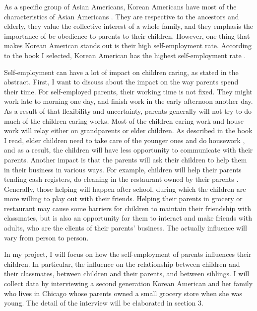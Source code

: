 As a specific group of Asian Americans, Korean Americans have most of the
characteristics of Asian Americans \cite{online:AsianAmericanChar}. They are
respective to the ancestors and elderly, they value the collective interest of a
whole family, and they emphasis the importance of be obedience to parents to
their children. However, one thing that makes Korean American stands out is
their high self-employment rate. According to the book I selected, Korean
American has the highest self-employment
rate \cite[p.~14]{book:ISelected}. 
\par
Self-employment can have a lot of impact on children caring, as stated in the
abstract. First, I want to discuss about the impact on the way parents spend
their time. For self-employed parents, their working time is not fixed. They
might work late to morning one day, and finish work in the early afternoon
another day. As a result of that flexibility and uncertainty, parents generally
will not try to do much of the children caring works. Most of the children
caring work and house work will relay either on grandparents or elder children.
As described in the book I read, elder children need to take care of the younger
ones and do housework \cite[p.~22]{book:ISelected}, and as a result, the
children will have less opportunity to communicate with their parents. Another
impact is that the parents will ask their children to help them in their
business in various ways. For example, children
will help their parents tending cash registers, do
cleaning in the restaurant owned by their parents \cite[p.~25]{book:ISelected}.
Generally, those helping will happen after school, during which the children are
more willing to play out with their friends. Helping their parents in grocery or
restaurant may cause some barriers for children to maintain their friendship
with classmates, but is also an opportunity for them to interact and make
friends with adults, who are the clients of their parents' business. The
actually influence will vary from person to person.
\par
In my project, I will focus on how the self-employment of parents influences
their children. In particular, the influence on the relationship between
children and their classmates, between children and their parents, and between
siblings. I will collect data by interviewing a second generation Korean
American and her family who lives in Chicago whose parents owned a small
grocery store when she was young.
The detail of the interview will be elaborated in section 3.
